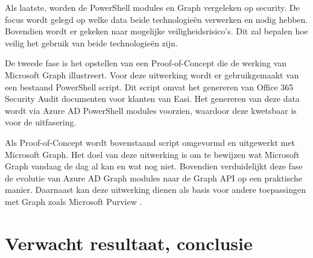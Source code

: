 Als laatste, worden de PowerShell modules en Graph vergeleken op security. De focus wordt gelegd op welke data beide technologieën verwerken en nodig hebben. Bovendien wordt er gekeken naar mogelijke veiligheidsrisico's. Dit zal bepalen hoe veilig het gebruik van beide technologieën zijn.

De tweede fase is het opstellen van een Proof-of-Concept die de werking van Microsoft Graph illustreert. Voor deze uitwerking wordt er gebruikgemaakt van een bestaand PowerShell script. Dit script omvat het genereren van Office 365 Security Audit documenten voor klanten van Easi. Het genereren van deze data wordt via Azure AD PowerShell modules voorzien, waardoor deze kwetsbaar is voor de uitfasering. 

Als Proof-of-Concept wordt bovenstaand script omgevormd en uitgewerkt met Microsoft Graph. Het doel van deze uitwerking is om te bewijzen wat Microsoft Graph vandaag de dag al kan en wat nog niet. Bovendien verduidelijkt deze fase de evolutie van Azure AD Graph modules naar de Graph API op een praktische manier. Daarnaast kan deze uitwerking dienen als basis voor andere toepassingen met Graph zoals Microsoft Purview \autocite{Microsoft2023V}. 

\section{Verwacht resultaat, conclusie}%
\label{sec:verwachte_resultaten}

